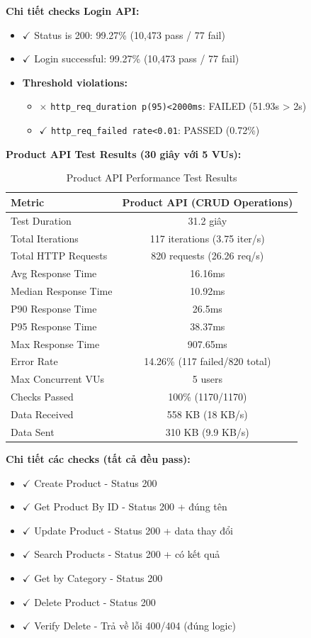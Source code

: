 \textbf{Chi tiết checks Login API:}
\begin{itemize}
    \item $\checkmark$ Status is 200: 99.27\% (10,473 pass / 77 fail)
    \item $\checkmark$ Login successful: 99.27\% (10,473 pass / 77 fail)
    \item \textbf{Threshold violations:}
    \begin{itemize}
        \item $\times$ \texttt{http\_req\_duration p(95)<2000ms}: FAILED (51.93s > 2s)
        \item $\checkmark$ \texttt{http\_req\_failed rate<0.01}: PASSED (0.72\%)
    \end{itemize}
\end{itemize}

\textbf{Product API Test Results (30 giây với 5 VUs):}
\begin{table}[H]
\centering
\begin{tabular}{|l|c|}
\hline
\textbf{Metric} & \textbf{Product API (CRUD Operations)} \\
\hline
Test Duration & 31.2 giây \\
\hline
Total Iterations & 117 iterations (3.75 iter/s) \\
\hline
Total HTTP Requests & 820 requests (26.26 req/s) \\
\hline
Avg Response Time & 16.16ms \\
\hline
Median Response Time & 10.92ms \\
\hline
P90 Response Time & 26.5ms \\
\hline
P95 Response Time & 38.37ms \\
\hline
Max Response Time & 907.65ms \\
\hline
Error Rate & 14.26\% (117 failed/820 total) \\
\hline
Max Concurrent VUs & 5 users \\
\hline
Checks Passed & 100\% (1170/1170) \\
\hline
Data Received & 558 KB (18 KB/s) \\
\hline
Data Sent & 310 KB (9.9 KB/s) \\
\hline
\end{tabular}
\caption{Product API Performance Test Results}
\end{table}

\textbf{Chi tiết các checks (tất cả đều pass):}
\begin{itemize}
    \item $\checkmark$ Create Product - Status 200
    \item $\checkmark$ Get Product By ID - Status 200 + đúng tên
    \item $\checkmark$ Update Product - Status 200 + data thay đổi
    \item $\checkmark$ Search Products - Status 200 + có kết quả
    \item $\checkmark$ Get by Category - Status 200
    \item $\checkmark$ Delete Product - Status 200
    \item $\checkmark$ Verify Delete - Trả về lỗi 400/404 (đúng logic)
\end{itemize}

